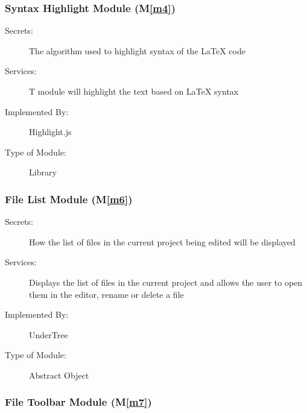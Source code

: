 \documentclass[12pt, titlepage]{article}
\newcommand{\mref}[1]{M\ref{#1}}
\begin{document}
	\subsubsection{Syntax Highlight Module (\mref{m4})}
	
	\begin{description}
		\item[Secrets:] The algorithm used to highlight syntax of the LaTeX code
		\item[Services:] T module will highlight the text based on LaTeX syntax
		\item[Implemented By:] Highlight.js
		\item[Type of Module:] Library
	\end{description}
	
	
	
	\subsubsection{File List Module (\mref{m6})}
	
	\begin{description}
		\item[Secrets:] How the list of files in the current project being edited will be displayed
		\item[Services:] Displays the list of files in the current project and allows the user to open them in the editor, rename or delete a file
		\item[Implemented By:] UnderTree
		\item[Type of Module:] Abstract Object
	\end{description}
	
	\subsubsection{File Toolbar Module (\mref{m7})}
	
\end{document}
